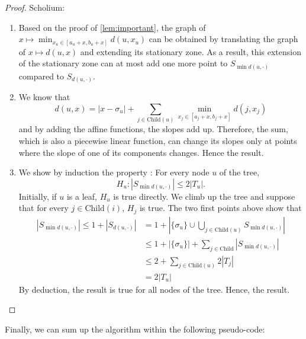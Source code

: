 \documentclass{article}
\begin{document}
\begin{proof}
    Scholium:
    \begin{enumerate}
        \item Based on the proof of \autoref{lem:important}, the graph of 
        $x\mapsto\min_{x_u \in [a_u+x,b_u+x]}d(u,x_u)$ can be obtained by 
        translating the graph of $x\mapsto d(u,x)$ and extending its stationary 
        zone. As a result, this extension of the stationary zone can at most add 
        one more point to $S_{\min d(u,\cdot)}$ compared to $S_{d(u,\cdot)}$.
        \item We know that 
        \[d(u,x) = |x-\sigma_u| + \sum_{j\in \text{Child}(u)}\min_{x_j \in [a_j+x,b_j+x]}d(j,x_j)\] 
        and by adding the affine functions, the slopes add up. Therefore, the sum, 
        which is also a piecewise linear function, can change its slopes only at 
        points where the slope of one of its components changes. Hence the result.
        \item We show by induction the property : For every node $u$ of the 
        tree, \[H_u: |S_{\min d(u,\cdot)}| \leq 2|T_u|.\] 
        Initially, if $u$ is a leaf, $H_u$ is true directly. 
        We climb up the tree and suppose that for every 
        $j \in \text{Child}(i)$, $H_j$ is true. The two first points above show that
        \begin{equation}
            \begin{split}
                |S_{\min d(u,\cdot)}| \leq 1 + |S_{d(u,\cdot)}| 
                & = 1 + |\{\sigma_u\}\cup \bigcup_{j\in\text{Child}(u)}S_{\min d(u,\cdot)}| \\
                & \leq 1 + |\{\sigma_u\}| + \sum_{j\in\text{Child}} |S_{\min d(u,\cdot)}| \\
                & \leq 2 + \sum_{j\in\text{Child}(u)}2|T_j|\\
                & = 2|T_u|
            \end{split}
        \end{equation}
        By deduction, the result is true for all nodes of the tree. Hence, the result. 
    \end{enumerate}
\end{proof}

Finally, we can sum up the algorithm within the following pseudo-code:
\end{document}
